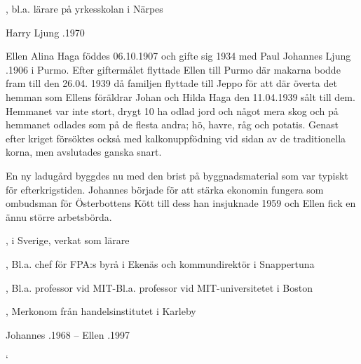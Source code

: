 \begin{jhchildren}
  \item {}
  \item {}, bl.a. lärare på yrkesskolan i Närpes
  \item {}
\end{jhchildren}

Harry Ljung .1970



Ellen Alina Haga föddes 06.10.1907 och gifte sig  1934 med Paul Johannes Ljung .1906 i Purmo. Efter giftermålet flyttade Ellen till Purmo där makarna bodde fram till den 26.04. 1939 då familjen flyttade till Jeppo för att där överta det hemman som Ellens föräldrar Johan och Hilda Haga den 11.04.1939 sålt till dem. Hemmanet var inte stort, drygt 10 ha odlad jord och något mera skog och på hemmanet odlades som på de flesta andra; hö, havre, råg och potatis. Genast efter kriget försöktes också med kalkonuppfödning vid sidan av de traditionella korna, men avslutades ganska snart.


En ny ladugård byggdes nu med den brist på byggnadsmaterial som var typiskt för efterkrigstiden. Johannes började för att stärka ekonomin fungera som ombudsman för Österbottens Kött till dess han insjuknade 1959 och Ellen fick en ännu större arbetsbörda.

\begin{jhchildren}
  \item {}
  \item {}, i Sverige, verkat som lärare
  \item {}, Bl.a. chef för FPA:s byrå i Ekenäs och kommundirektör i Snappertuna
  \item {}, Bl.a. professor vid MIT-Bl.a. professor vid MIT-universitetet i Boston
  \item {}, Merkonom från handelsinstitutet i Karleby
\end{jhchildren}

Johannes .1968   --    Ellen .1997


`

